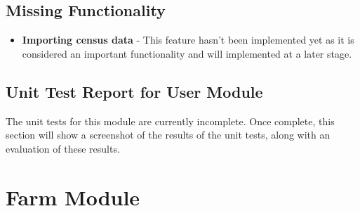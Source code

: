 \documentclass[11pt,fleqn]{book} %
\begin{document}
		\subsection{Missing Functionality}
			\begin{itemize}
				\item\textbf{Importing census data} -
				This feature hasn't been implemented yet as it is considered  an important functionality and will implemented at a later stage.
			\end{itemize}
		\subsection{Unit Test Report for User Module}
			The unit tests for this module are currently incomplete. Once complete, this section will show a screenshot of the results of the unit tests, along with an evaluation of these results.
		
	\section{Farm Module}	
\end{document}
